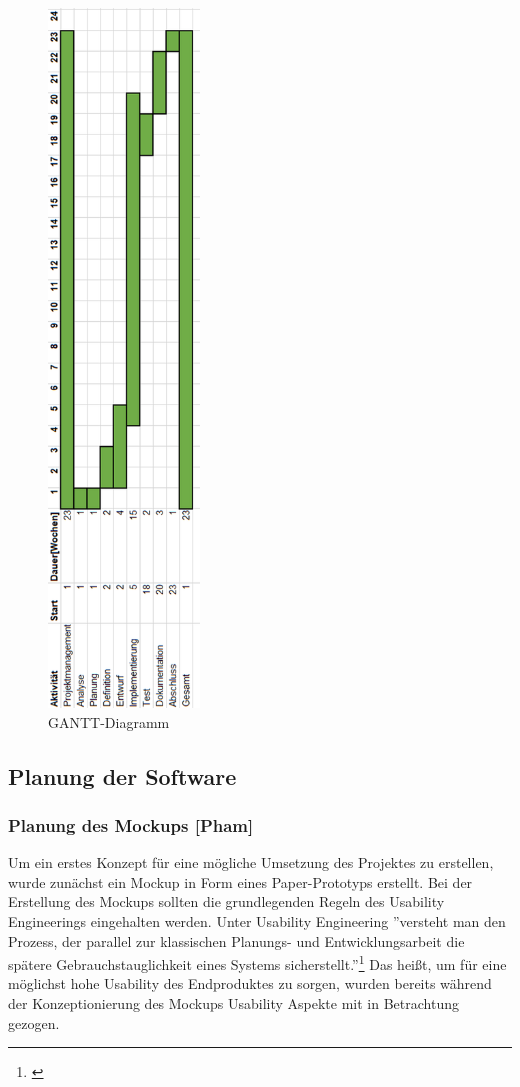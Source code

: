 \begin{figure}[!h]
	\includegraphics[width=\textwidth,height=50em,keepaspectratio]{img/projektablaufplan-gantt}
	\caption[GANTT-Diagramm]{GANTT-Diagramm\footnotemark}
\end{figure}

\clearpage


\subsection{Planung der Software}

\subsubsection{Planung des Mockups [Pham]}

Um ein erstes Konzept für eine mögliche Umsetzung des Projektes zu erstellen, wurde zunächst ein Mockup in Form eines Paper-Prototyps erstellt. Bei der Erstellung des Mockups sollten die grundlegenden Regeln des Usability Engineerings eingehalten werden. Unter Usability Engineering ''versteht man den Prozess, der parallel zur klassischen Planungs- und Entwicklungsarbeit die spätere Gebrauchstauglichkeit eines Systems sicherstellt.''\footnote{\cite[][S.~204]{handbuchusability2007}} Das heißt, um für eine möglichst hohe Usability des Endproduktes zu sorgen, wurden bereits während der Konzeptionierung des Mockups Usability Aspekte mit in Betrachtung gezogen. 

